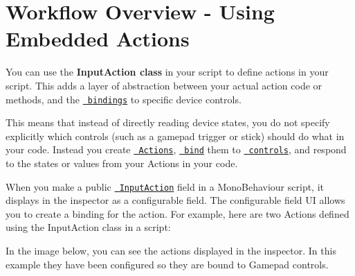 \chapter{Workflow Overview -\/ Using Embedded Actions}
\hypertarget{md__hey_tea_9_2_library_2_package_cache_2com_8unity_8inputsystem_0d1_86_83_2_documentation_0i_2_workflow-_embedded}{}\label{md__hey_tea_9_2_library_2_package_cache_2com_8unity_8inputsystem_0d1_86_83_2_documentation_0i_2_workflow-_embedded}
\label{md__hey_tea_9_2_library_2_package_cache_2com_8unity_8inputsystem_0d1_86_83_2_documentation_0i_2_workflow-_embedded_autotoc_md1610}%
%
 

You can use the {\bfseries{Input\+Action class}} in your script to define actions in your script. This adds a layer of abstraction between your actual action code or methods, and the \href{ActionBindings.html}{\texttt{ bindings}} to specific device controls.

This means that instead of directly reading device states, you do not specify explicitly which controls (such as a gamepad trigger or stick) should do what in your code. Instead you create \href{Actions.html}{\texttt{ Actions}}, \href{ActionBindings.html}{\texttt{ bind}} them to \href{Controls.html}{\texttt{ controls}}, and respond to the states or values from your Actions in your code.

When you make a public \href{../api/UnityEngine.InputSystem.InputAction.html}{\texttt{ Input\+Action}} field in a Mono\+Behaviour script, it displays in the inspector as a configurable field. The configurable field UI allows you to create a binding for the action. For example, here are two Actions defined using the Input\+Action class in a script\+:


\begin{DoxyCode}{0}
\DoxyCodeLine{}
\DoxyCodeLine{\{}
\DoxyCodeLine{\}}

\end{DoxyCode}


In the image below, you can see the actions displayed in the inspector. In this example they have been configured so they are bound to Gamepad controls.



